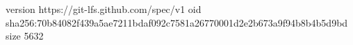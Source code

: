 version https://git-lfs.github.com/spec/v1
oid sha256:70b84082f439a5ae7211bdaf092c7581a26770001d2e2b673a9f94b8b4b5d9bd
size 5632
